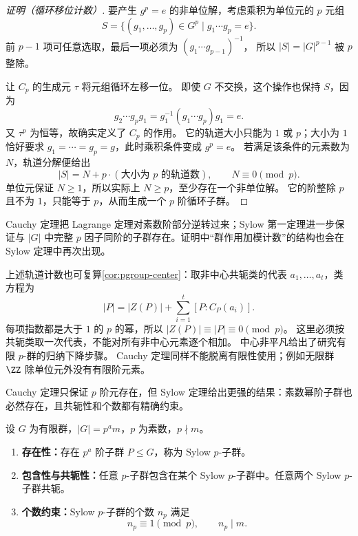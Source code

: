\par\medskip
\begin{proof}[证明（循环移位计数）]
要产生 $g^p=e$ 的非单位解，考虑乘积为单位元的 $p$ 元组
\[
S=\{(g_1,\dots,g_p)\in G^p\mid g_1\cdots g_p=e\}.
\]
前 $p-1$ 项可任意选取，最后一项必须为 $(g_1\cdots g_{p-1})^{-1}$，
所以 $|S|=|G|^{p-1}$ 被 $p$ 整除。

让 $C_p$ 的生成元 $\tau$ 将元组循环左移一位。
即使 $G$ 不交换，这个操作也保持 $S$，因为
\[
g_2\cdots g_pg_1=g_1^{-1}(g_1\cdots g_p)g_1=e.
\]
又 $\tau^p$ 为恒等，故确实定义了 $C_p$ 的作用。
它的轨道大小只能为 $1$ 或 $p$；大小为 $1$ 恰好要求
$g_1=\cdots=g_p=g$，此时乘积条件变成 $g^p=e$。
若满足该条件的元素数为 $N$，轨道分解便给出
\[
|S|=N+p\cdot(\text{大小为 }p\text{ 的轨道数}),\qquad N\equiv0\pmod p.
\]
单位元保证 $N\ge1$，所以实际上 $N\ge p$，至少存在一个非单位解。
它的阶整除 $p$ 且不为 $1$，只能等于 $p$，从而生成一个 $p$ 阶循环子群。
\end{proof}\par\medskip

Cauchy 定理把 Lagrange 定理对素数阶部分逆转过来；Sylow 第一定理进一步保证与 $|G|$ 中完整 $p$ 因子同阶的子群存在。证明中“群作用加模计数”的结构也会在 Sylow 定理中再次出现。

上述轨道计数也可复算\cref{cor:pgroup-center}：取非中心共轭类的代表 $a_1,\dots,a_t$，类方程为
\[
|P|=|Z(P)|+\sum_{i=1}^t[P:C_P(a_i)].
\]
每项指数都是大于 $1$ 的 $p$ 的幂，所以 $|Z(P)|\equiv|P|\equiv0\pmod p$。
这里必须按共轭类取一次代表，不能对所有非中心元素逐个相加。
中心非平凡给出了研究有限 $p$-群的归纳下降步骤。
Cauchy 定理同样不能脱离有限性使用；例如无限群 $\ZZ$ 除单位元外没有有限阶元素。

Cauchy 定理只保证 $p$ 阶元存在，但 Sylow 定理给出更强的结果：素数幂阶子群也必然存在，且共轭性和个数都有精确约束。

\begin{theorem}[Sylow 定理]
设 $G$ 为有限群，$\lvert G\rvert=p^a m$，$p$ 为素数，$p\nmid m$。
\begin{enumerate}[label=(\roman*),leftmargin=3em]
\item \textbf{存在性：}存在 $p^a$ 阶子群 $P\leqslant G$，称为 Sylow $p$-子群。
\item \textbf{包含性与共轭性：}任意 $p$-子群包含在某个 Sylow $p$-子群中。任意两个 Sylow $p$-子群共轭。
\item \textbf{个数约束：}Sylow $p$-子群的个数 $n_p$ 满足
\[
n_p\equiv1\pmod{p},
\qquad
n_p\mid m.
\]
\end{enumerate}
\label{thm:sylow}
\end{theorem}

